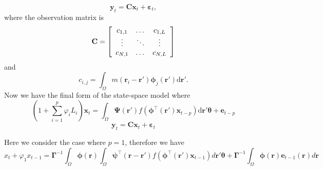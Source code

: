\documentclass[a4paper,10pt]{article}
\begin{document}
\begin{equation}\label{ObservationEquation} 
	\mathbf{y}_t = \mathbf{C}\mathbf{x}_t + \boldsymbol{\varepsilon}_t,
\end{equation}
where the observation matrix is 
\begin{equation}
	\mathbf{C} = \left[
	\begin{array}{{ccc}} 
		c_{1,1} & \dots & c_{1,L} \\
		\vdots & \ddots & \vdots \\
		c_{N,1} & \dots & c_{N,L} 
	\end{array}
	\right] 
\end{equation}
and 
\begin{equation}
	c_{i,j} = \int_{\Omega}m(\mathbf{r}_i - \mathbf{r}')\boldsymbol{\phi}_j(\mathbf{r}')\textrm{d}\mathbf{r}'. 
\end{equation}
Now we have the final form of the state-space model where
\begin{equation}\label{eq:finalformstatespacemodel}
	(1+\sum_{i=1}^{p}\varphi_i L_i) \mathbf{x}_t = \int_\Omega \boldsymbol{\Psi}(\mathbf{r}') f(\boldsymbol{\phi}^{\top}(\mathbf{r}')\mathbf{x}_{t-p}) \textrm{d}\mathbf{r}' \boldsymbol{\theta}
 +\mathbf{e}_{t-p}
\end{equation}
\begin{equation} 
	\mathbf{y}_t = \mathbf{C}\mathbf{x}_t + \boldsymbol{\varepsilon}_t
\end{equation}


Here we consider the case where $p=1$, therefore we have
\begin{equation}
x_t+\varphi_{1} x_{t-1}=\boldsymbol\Gamma^{-1}\int_{\Omega}\boldsymbol \phi(\mathbf r)\int_{\Omega}\boldsymbol{\psi}^\top\left(\mathbf{r}-\mathbf{r}'\right) f(\boldsymbol{\phi}^{\top}\left(\mathbf{r'}\right) \mathbf{x}_{t-1})d\mathbf r'\boldsymbol{\theta}+\boldsymbol\Gamma^{-1}\int_{\Omega}\boldsymbol\phi(\mathbf r)\mathbf e_{t-1}(\mathbf r)d\mathbf r
\end{equation}
\end{document}
